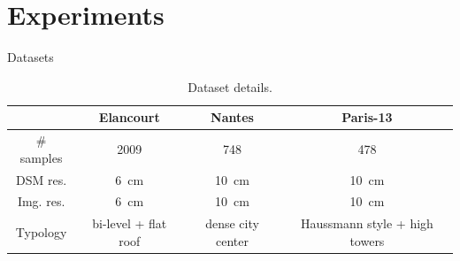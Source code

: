 \documentclass[10pt, export]{beamer}
\begin{document}
    \section{Experiments}
        \begin{frame}{Datasets}
            \begin{table}
                \begin{center}
                    \scriptsize
                    \begin{tabular}{c c c c}
                        \toprule
                        & \textbf{Elancourt} & \textbf{Nantes} & \textbf{Paris-13} \\
                        \midrule
                        \# samples & 2009 & 748 & 478 \\
                        DSM res. & \SI{6}{\cm} & \SI{10}{\cm} & \SI{10}{\cm} \\
                        Img. res. & \SI{6}{\cm} & \SI{10}{\cm} & \SI{10}{\cm} \\
                        Typology & bi-level + flat roof & dense city center & Haussmann style + high towers \\
                        \bottomrule
                    \end{tabular}
                    \caption{Dataset details.}
                \end{center}
            \end{table}
        \end{frame}
\end{document}
